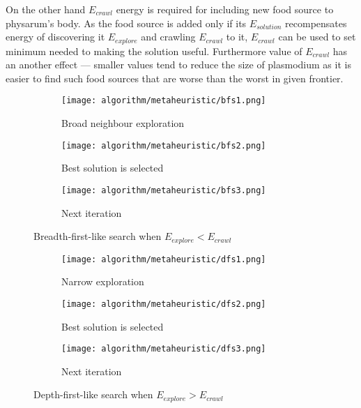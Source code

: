 On the other hand $E_{crawl}$ energy is required for including new food source to physarum's body. As the food source is added only if its $E_{solution}$ recompensates energy of discovering it $E_{explore}$ and crawling $E_{crawl}$ to it, $E_{crawl}$ can be used to set minimum needed to making the solution useful. Furthermore value of $E_{crawl}$ has an another effect --- smaller values tend to reduce the size of plasmodium as it is easier to find such food sources that are worse than the worst in given frontier.

\begin{figure}
  \centering

  \begin{subfigure}{0.3\textwidth}
    \centering
    \texttt{[image: algorithm/metaheuristic/bfs1.png]}
    \caption{Broad neighbour exploration}
  \end{subfigure}
  \begin{subfigure}{0.3\textwidth}
    \centering
    \texttt{[image: algorithm/metaheuristic/bfs2.png]}
    \caption{Best solution is selected}
  \end{subfigure}
  \begin{subfigure}{0.3\textwidth}
    \centering
    \texttt{[image: algorithm/metaheuristic/bfs3.png]}
    \caption{Next iteration}
  \end{subfigure}

  \caption{Breadth-first-like search when $E_{explore} < E_{crawl}$}
  \label{figure:m_explore_bfs}
\end{figure}

\begin{figure}
  \centering

  \begin{subfigure}{0.3\textwidth}
    \centering
    \texttt{[image: algorithm/metaheuristic/dfs1.png]}
    \caption{Narrow exploration}
  \end{subfigure}
  \begin{subfigure}{0.3\textwidth}
    \centering
    \texttt{[image: algorithm/metaheuristic/dfs2.png]}
    \caption{Best solution is selected}
  \end{subfigure}
  \begin{subfigure}{0.3\textwidth}
    \centering
    \texttt{[image: algorithm/metaheuristic/dfs3.png]}
    \caption{Next iteration}
  \end{subfigure}

  \caption{Depth-first-like search when $E_{explore} > E_{crawl}$}
  \label{figure:m_explore_dfs}
\end{figure}

